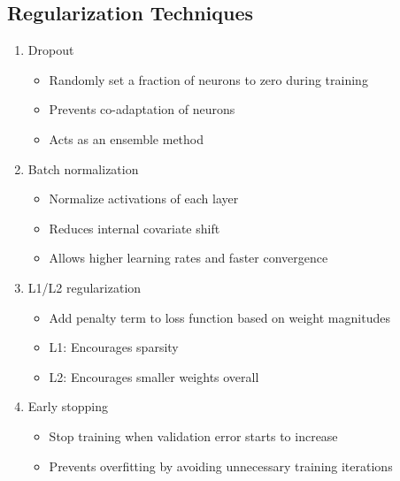 \documentclass{article}
\begin{document}
\subsection{Regularization Techniques}
\begin{enumerate}
    \item Dropout
    \begin{itemize}
        \item Randomly set a fraction of neurons to zero during training
        \item Prevents co-adaptation of neurons
        \item Acts as an ensemble method
    \end{itemize}
    
    \item Batch normalization
    \begin{itemize}
        \item Normalize activations of each layer
        \item Reduces internal covariate shift
        \item Allows higher learning rates and faster convergence
    \end{itemize}
    
    \item L1/L2 regularization
    \begin{itemize}
        \item Add penalty term to loss function based on weight magnitudes
        \item L1: Encourages sparsity
        \item L2: Encourages smaller weights overall
    \end{itemize}
    
    \item Early stopping
    \begin{itemize}
        \item Stop training when validation error starts to increase
        \item Prevents overfitting by avoiding unnecessary training iterations
    \end{itemize}
\end{enumerate}
\end{document}
